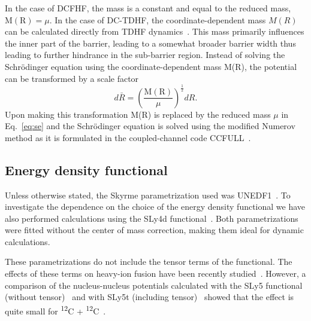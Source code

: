 In the case of DCFHF, the mass is a constant and equal to the reduced mass, $\mathrm{M(R)}=\mu$. 
In the case of DC-TDHF, the coordinate-dependent mass $M(R)$ can
be calculated directly from TDHF dynamics~\protect\cite{umar2009b}.
This mass primarily influences the inner part of the barrier, leading to a somewhat broader
barrier width thus leading to further hindrance in the sub-barrier region.
Instead of solving the Schr\"odinger equation using the coordinate-dependent mass M(R), the potential can be transformed by a scale factor~\protect\cite{umar2009b,goeke1983}
\begin{equation}
d\bar{R}=\left(\frac{\mathrm{M(R)}}{\mu}\right)^{\frac{1}{2}}dR.
\end{equation}
Upon making this transformation M(R) is replaced by the reduced mass $\mu$ in Eq.~\ref{eq:se} and the Schr\"odinger equation is solved using the modified Numerov method as it is formulated in the coupled-channel code CCFULL~\protect\cite{hagino1999}.

\subsection{Energy density functional}

Unless otherwise stated, the Skyrme parametrization used was UNEDF1~\protect\cite{kortelainen2012}.
To investigate the dependence on the choice of the energy density functional we have also performed calculations using the SLy4d functional~\protect\cite{kim1997}. 
Both parametrizations were fitted without the center of mass correction, making them ideal for dynamic calculations.

These parametrizations do not include the tensor terms of the functional.
The effects of these terms on heavy-ion fusion have been recently studied~\protect\cite{dai2014a,stevenson2016,guo2018}.
However, a comparison of the nucleus-nucleus potentials calculated with the SLy5 functional (without tensor)~\protect\cite{chabanat1998a} and with SLy5t (including tensor)~\protect\cite{colo2007}  showed that the effect is quite small for \textsuperscript{12}C + \textsuperscript{12}C~\protect\cite{guo2018b}.

